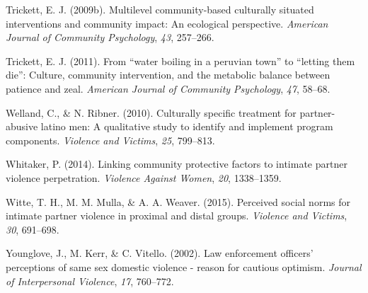 \documentclass[11pt,]{tufte-book}
\begin{document}
\hypertarget{ref-trickett2009multilevel}{}
Trickett, E. J. (2009b). Multilevel community-based culturally situated
interventions and community impact: An ecological perspective.
\emph{American Journal of Community Psychology}, \emph{43}, 257--266.

\hypertarget{ref-trickett2011water}{}
Trickett, E. J. (2011). From ``water boiling in a peruvian town'' to
``letting them die'': Culture, community intervention, and the metabolic
balance between patience and zeal. \emph{American Journal of Community
Psychology}, \emph{47}, 58--68.

\hypertarget{ref-welland2010culturally}{}
Welland, C., \& N. Ribner. (2010). Culturally specific treatment for
partner-abusive latino men: A qualitative study to identify and
implement program components. \emph{Violence and Victims}, \emph{25},
799--813.

\hypertarget{ref-whitaker2014linking}{}
Whitaker, P. (2014). Linking community protective factors to intimate
partner violence perpetration. \emph{Violence Against Women}, \emph{20},
1338--1359.

\hypertarget{ref-witte2015perceived}{}
Witte, T. H., M. M. Mulla, \& A. A. Weaver. (2015). Perceived social
norms for intimate partner violence in proximal and distal groups.
\emph{Violence and Victims}, \emph{30}, 691--698.

\hypertarget{ref-younglove2002law}{}
Younglove, J., M. Kerr, \& C. Vitello. (2002). Law enforcement officers'
perceptions of same sex domestic violence - reason for cautious
optimism. \emph{Journal of Interpersonal Violence}, \emph{17}, 760--772.
\end{document}
